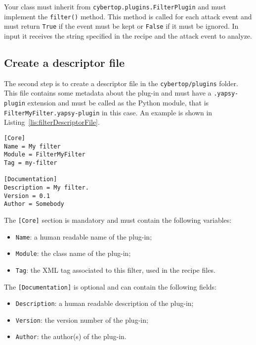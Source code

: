 \documentclass{scrartcl}
\begin{document}
Your class must inherit from \lstinline|cybertop.plugins.FilterPlugin| and must implement the \lstinline|filter()| method. This method is called for each attack event and must return \lstinline|True| if the event must be kept or \lstinline|False| if it must be ignored. In input it receives the string specified in the recipe and the attack event to analyze.

\subsection{Create a descriptor file}

The second step is to create a descriptor file in the \lstinline|cybertop/plugins| folder. This file contains some metadata about the plug-in and must have a \lstinline|.yapsy-plugin| extension and must be called as the Python module, that is \lstinline|FilterMyFilter.yapsy-plugin| in this case. An example is shown in Listing~\ref{lis:filterDescriptorFile}.

\begin{lstlisting}[caption = Example of a filter descriptor., label = lis:filterDescriptorFile]
[Core]
Name = My filter
Module = FilterMyFilter
Tag = my-filter

[Documentation]
Description = My filter.
Version = 0.1
Author = Somebody
\end{lstlisting}

The \lstinline|[Core]| section is mandatory and must contain the following variables:

\begin{itemize}
	\item \lstinline|Name|: a human readable name of the plug-in;
	\item \lstinline|Module|: the class name of the plug-in;
	\item \lstinline|Tag|: the XML tag associated to this filter, used in the recipe files.
\end{itemize}

The \lstinline|[Documentation]| is optional and can contain the following fields:

\begin{itemize}
	\item \lstinline|Description|: a human readable description of the plug-in;
	\item \lstinline|Version|: the version number of the plug-in;
	\item \lstinline|Author|: the author(s) of the plug-in.
\end{itemize}
\end{document}
